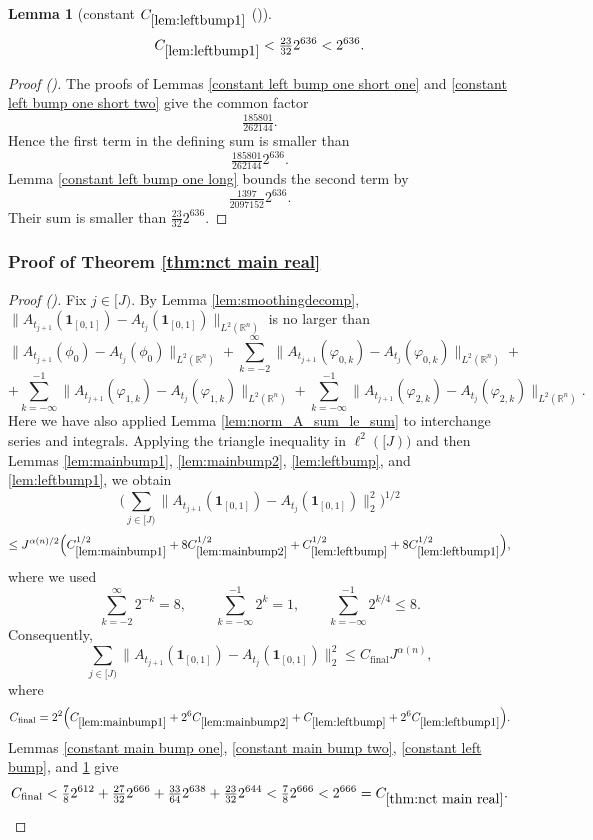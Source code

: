 \documentclass[12pt,reqno]{amsart}
\newcommand{\auto}{{({\tiny\faCar})}}
\theoremstyle{plain}
\newtheorem{lemma}[theorem]{Lemma}
\numberwithin{equation}{section}
\theoremstyle{remark}
\newcommand{\uses}[1]{}
\newcommand{\usesdefs}[1]{}
\newcommand{\R}{{\mathbb R}}
\begin{document}
\begin{lemma}[constant $C_{\ref{lem:leftbump1}}$ \auto]\label{constant left bump one}\uses{constant left bump one short one,constant left bump one short two,constant left bump one long,lem:leftbump1}\usesdefs{}
\begin{equation}\label{constant left bump one bound}
C_{\ref{lem:leftbump1}}<\tfrac{23}{32}2^{636}<2^{636}.
\end{equation}
\end{lemma}
\begin{proof}[Proof \auto]
The proofs of Lemmas \ref{constant left bump one short one} and \ref{constant left bump one short two} give the common factor
\[
\tfrac{185801}{262144}.
\]
Hence the first term in the defining sum is smaller than
\[
\tfrac{185801}{262144}2^{636}.
\]
Lemma \ref{constant left bump one long} bounds the second term by
\[
\tfrac{1397}{2097152}2^{636}.
\]
Their sum is smaller than $\frac{23}{32}2^{636}$.
\end{proof}


\subsubsection{\texorpdfstring{Proof of Theorem \ref{thm:nct main real}}{Proof of main theorem}}
\begin{proof}[Proof \auto]
Fix $j\in [J)$.
By Lemma \ref{lem:smoothingdecomp},
$\|A_{t_{j + 1}}(\mathbf{1}_{[0,1]}) - A_{t_{j}}(\mathbf{1}_{[0,1]})\|_{{L}^2(\R^n)}$
is no larger than
\[ \|A_{t_{j+1}}(\phi_0) - A_{t_j}(\phi_0)\|_{L^2(\R^n)}  + \sum_{k=-2}^\infty\|A_{t_{j+1}}(\varphi_{0,k}) - A_{t_{j}}(\varphi_{0,k})\|_{L^2(\R^n)}  + \]
\[ +\sum_{k=-\infty}^{-1}\|A_{t_{j+1}}(\varphi_{1,k}) - A_{t_{j}}(\varphi_{1,k})\|_{L^2(\R^n)}  + \sum_{k=-\infty}^{-1}\|A_{t_{j+1}}({\varphi_{2,k}}) - A_{t_{j}}({\varphi_{2,k}})\|_{L^2(\R^n)}. \]
Here we have also applied Lemma \ref{lem:norm_A_sum_le_sum} to interchange series and integrals.
Applying the triangle inequality in $\ell^2([J))$ and then Lemmas \ref{lem:mainbump1}, \ref{lem:mainbump2}, \ref{lem:leftbump}, and \ref{lem:leftbump1}, we obtain
\[
\Big(\sum_{j\in[J)}\|A_{t_{j+1}}(\mathbf1_{[0,1]})-A_{t_j}(\mathbf1_{[0,1]})\|_2^2\Big)^{1/2}
\]
\[
\le J^{\alpha(n)/2}\Big(
C_{\ref{lem:mainbump1}}^{1/2}
+8C_{\ref{lem:mainbump2}}^{1/2}
+C_{\ref{lem:leftbump}}^{1/2}
+8C_{\ref{lem:leftbump1}}^{1/2}
\Big),
\]
where we used
\[
\sum_{k=-2}^\infty2^{-k}=8,
\qquad
\sum_{k=-\infty}^{-1}2^k=1,
\qquad
\sum_{k=-\infty}^{-1}2^{k/4}\le8.
\]
Consequently,
\[
\sum_{j\in[J)}\|A_{t_{j+1}}(\mathbf1_{[0,1]})-A_{t_j}(\mathbf1_{[0,1]})\|_2^2
\le C_{\mathrm{final}}J^{\alpha(n)},
\]
where
\[
C_{\mathrm{final}}
=2^2\Big(
C_{\ref{lem:mainbump1}}
+2^6C_{\ref{lem:mainbump2}}
+C_{\ref{lem:leftbump}}
+2^6C_{\ref{lem:leftbump1}}
\Big).
\]
Lemmas \ref{constant main bump one}, \ref{constant main bump two}, \ref{constant left bump}, and \ref{constant left bump one} give
\[
C_{\mathrm{final}}
<\tfrac78 2^{612}
+\tfrac{27}{32}2^{666}
+\tfrac{33}{64}2^{638}
+\tfrac{23}{32}2^{644}
<\tfrac78 2^{666}
<2^{666}
=C_{\ref{thm:nct main real}}.
\]
\end{proof}
\end{document}

